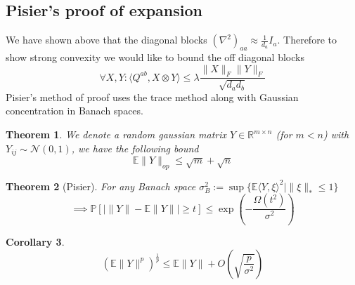 \documentclass{article}
\newtheorem{theorem}{Theorem}
\newtheorem{corollary}[theorem]{Corollary}
\newcommand{\R}{{\mathbb{R}}}
\newcommand{\E}{\mathbb{E}}
\renewcommand{\Pr}{\mathbb{P}}
\begin{document}
\subsection{Pisier's proof of expansion}
We have shown above that the diagonal blocks $(\nabla^{2})_{aa} \approx \frac{1}{d_{a}} I_{a}$. Therefore to show strong convexity we would like to bound the off diagonal blocks
\[ \forall X,Y:  \langle Q^{ab}, X \otimes Y \rangle \leq \lambda \frac{\|X\|_{F} \|Y\|_{F}}{\sqrt{d_{a} d_{b}}}   \]
Pisier's method of proof uses the trace method along with Gaussian concentration in Banach spaces.

\begin{theorem}
We denote a random gaussian matrix $Y \in \R^{m \times n}$ (for $m < n$) with $Y_{ij} \sim \mathcal{N}(0,1)$, we have the following bound
\[ \E \|Y\|_{op} \leq \sqrt{m} + \sqrt{n} \]
\end{theorem}

%

\begin{theorem} [Pisier]
For any Banach space $\sigma_{B}^{2} := \sup \{ \E \langle Y, \xi \rangle^{2} \mid \|\xi\|_{*} \leq 1 \} $
\[ \implies \Pr [ | \|Y\| - \E \|Y\| | \geq t ] \leq \exp \left( - \frac{\Omega(t^{2})}{\sigma^{2}} \right)   \]
\end{theorem}

\begin{corollary}
\[ (\E \|Y\|^{p})^{\frac{1}{p}} \leq \E \|Y\| + O \left( \sqrt{\frac{p}{\sigma^{2}}} \right)   \]
\end{corollary}
\end{document}
